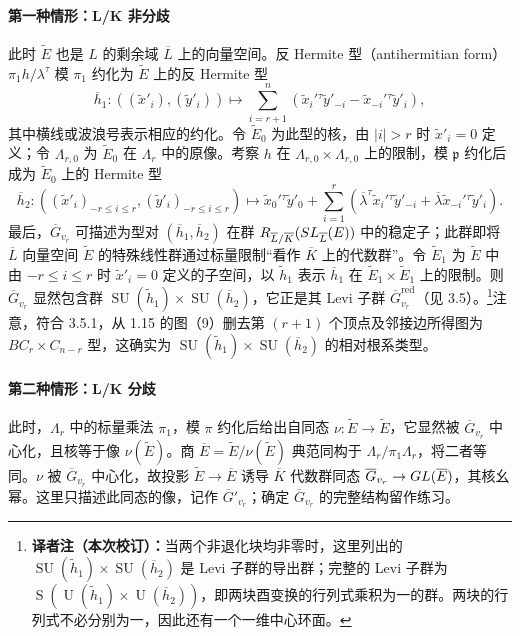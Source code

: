\paragraph*{第一种情形：L/K 非分歧}此时 $\widetilde E$ 也是 $L$ 的剩余域 $\overline L$ 上的向量空间。反 Hermite 型（antihermitian form）$\pi_1h/\lambda^\tau$ 模 $\pi_1$ 约化为 $\widetilde E$ 上的反 Hermite 型
\[
\overline h_1:((\widetilde x'_i),(\widetilde y'_i))\longmapsto
\sum_{i=r+1}^n(\widetilde x_i'{}^\tau\widetilde y'_{-i}-\widetilde x_{-i}'{}^\tau\widetilde y'_i),
\]
其中横线或波浪号表示相应的约化。令 $\widetilde E_0$ 为此型的核，由 $|i|>r$ 时 $\widetilde x'_i=0$ 定义；令 $\Lambda_{r,0}$ 为 $\widetilde E_0$ 在 $\Lambda_r$ 中的原像。考察 $h$ 在 $\Lambda_{r,0}\times\Lambda_{r,0}$ 上的限制，模 $\mathfrak p$ 约化后成为 $\widetilde E_0$ 上的 Hermite 型
\[
\overline h_2:((\widetilde x'_i)_{-r\leq i\leq r},(\widetilde y'_i)_{-r\leq i\leq r})\longmapsto
\widetilde x_0'{}^\tau\widetilde y'_0+
\sum_{i=1}^r(\overline\lambda^\tau\widetilde x_i'{}^\tau\widetilde y'_{-i}
+\overline\lambda\widetilde x_{-i}'{}^\tau\widetilde y'_i).
\]
最后，$\overline G_{v_r}$ 可描述为型对 $(\overline h_1,\overline h_2)$ 在群 $R_{\overline L/\overline K}(SL_{\overline L}(E))$ 中的稳定子；此群即将 $\overline L$ 向量空间 $\widetilde E$ 的特殊线性群通过标量限制“看作 $\overline K$ 上的代数群”。令 $\widetilde E_1$ 为 $\widetilde E$ 中由 $-r\leq i\leq r$ 时 $\widetilde x'_i=0$ 定义的子空间，以 $\widetilde h_1$ 表示 $\overline h_1$ 在 $\widetilde E_1\times\widetilde E_1$ 上的限制。则 $\overline G_{v_r}$ 显然包含群 $\operatorname{SU}(\widetilde h_1)\times\operatorname{SU}(\overline h_2)$，它正是其 Levi 子群 $\overline G_{v_r}^{\mathrm{red}}$（见 3.5）。\footnote{\textbf{译者注（本次校订）：}当两个非退化块均非零时，这里列出的 $\operatorname{SU}(\widetilde h_1)\times\operatorname{SU}(\overline h_2)$ 是 Levi 子群的导出群；完整的 Levi 子群为 $\operatorname{S}(\operatorname U(\widetilde h_1)\times\operatorname U(\overline h_2))$，即两块酉变换的行列式乘积为一的群。两块的行列式不必分别为一，因此还有一个一维中心环面。}注意，符合 3.5.1，从 1.15 的图（9）删去第 $(r+1)$ 个顶点及邻接边所得图为 $BC_r\times C_{n-r}$ 型，这确实为 $\operatorname{SU}(\widetilde h_1)\times\operatorname{SU}(\overline h_2)$ 的相对根系类型。

\paragraph*{第二种情形：L/K 分歧}此时，$\Lambda_r$ 中的标量乘法 $\pi_1$，模 $\pi$ 约化后给出自同态 $\nu:\widetilde E\to\widetilde E$，它显然被 $\overline G_{v_r}$ 中心化，且核等于像 $\nu(\widetilde E)$。商 $\overline E=\widetilde E/\nu(\widetilde E)$ 典范同构于 $\Lambda_r/\pi_1\Lambda_r$，将二者等同。$\nu$ 被 $\overline G_{v_r}$ 中心化，故投影 $\widetilde E\to\overline E$ 诱导 $\overline K$ 代数群同态 $\overline G_{v_r}\to GL(\overline E)$，其核幺幂。这里只描述此同态的像，记作 $\overline G'_{v_r}$；确定 $\overline G_{v_r}$ 的完整结构留作练习。

